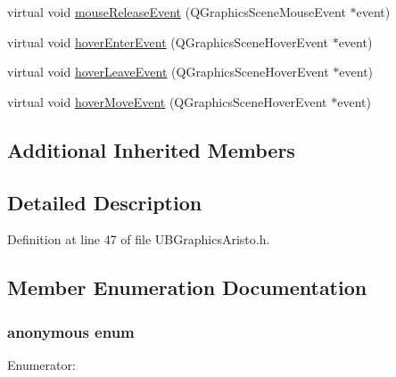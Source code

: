 \begin{DoxyCompactItemize}
\item 
virtual void \hyperlink{class_u_b_graphics_aristo_a10e21b4981c8b19255c6e7ff4f64b6a8}{mouse\-Release\-Event} (Q\-Graphics\-Scene\-Mouse\-Event $\ast$event)
\item 
virtual void \hyperlink{class_u_b_graphics_aristo_af0efa637a7053d42593a8e54a041bf3f}{hover\-Enter\-Event} (Q\-Graphics\-Scene\-Hover\-Event $\ast$event)
\item 
virtual void \hyperlink{class_u_b_graphics_aristo_a0130bf4692fb924ebc15e6b1035dfca0}{hover\-Leave\-Event} (Q\-Graphics\-Scene\-Hover\-Event $\ast$event)
\item 
virtual void \hyperlink{class_u_b_graphics_aristo_a07eb72e705daa05c9a5bcbf6baa3b914}{hover\-Move\-Event} (Q\-Graphics\-Scene\-Hover\-Event $\ast$event)
\end{DoxyCompactItemize}
\subsection*{Additional Inherited Members}


\subsection{Detailed Description}


Definition at line 47 of file U\-B\-Graphics\-Aristo.\-h.



\subsection{Member Enumeration Documentation}
\hypertarget{class_u_b_graphics_aristo_a7a0f579cd086632cbee1f592634dbb6c}{\subsubsection[{anonymous enum}]{\setlength{\rightskip}{0pt plus 5cm}anonymous enum}}\label{dc/dfd/class_u_b_graphics_aristo_a7a0f579cd086632cbee1f592634dbb6c}
\begin{Desc}
\item[Enumerator\-: ]\par
\begin{description}
\item[{\em 
\hypertarget{class_u_b_graphics_aristo_a7a0f579cd086632cbee1f592634dbb6cabfa194083f39b4a96dede71c8b56b8c3}{Type}\label{dc/dfd/class_u_b_graphics_aristo_a7a0f579cd086632cbee1f592634dbb6cabfa194083f39b4a96dede71c8b56b8c3}
}]\end{description}
\end{Desc}



